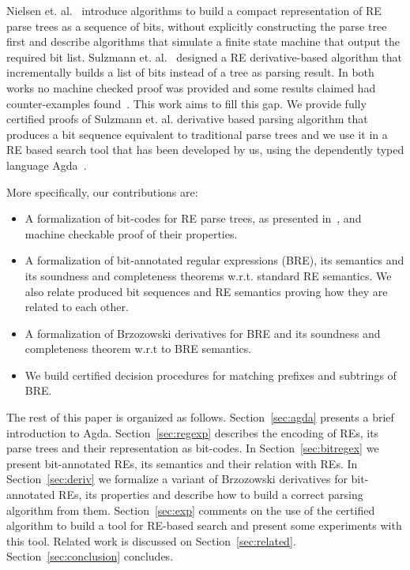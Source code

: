\documentclass[sigplan, anonymous, review]{acmart}
\theoremstyle{definition}
\begin{document}
Nielsen et. al.~\cite{Nielsen2011} introduce algorithms to build a compact representation of
RE parse trees as a sequence of bits, without explicitly constructing the parse tree first
and describe algorithms that simulate a finite state machine that output the required bit list. 
Sulzmann et. al.~\cite{SulzmannL14} designed a RE derivative-based algorithm
that incrementally builds a list of bits instead of a tree as parsing result. In both works
no machine checked proof was provided and some results claimed had counter-examples
found~\cite{AusafDU16}. This work aims to fill this gap. We provide fully 
certified proofs of Sulzmann et. al. derivative based parsing algorithm that 
produces a bit sequence equivalent to traditional parse trees and we use it 
in a RE based search tool that has been developed by us, using the dependently typed language
Agda~\cite{Norell2009}.

More specifically, our contributions are:
\begin{itemize}
  \item A formalization of bit-codes for RE parse trees, as presented in~\cite{Nielsen2011},
        and machine checkable proof of their properties.
  \item A formalization of bit-annotated regular expressions (BRE), its semantics 
        and its soundness and completeness theorems w.r.t. standard RE semantics. 
        We also relate produced bit sequences and RE semantics proving how they 
        are related to each other.
  \item A formalization of Brzozowski derivatives for BRE and its soundness and
        completeness theorem w.r.t to BRE semantics.
  \item We build certified decision procedures for matching prefixes and subtrings
        of BRE.
\end{itemize}

The rest of this paper is organized as follows. Section~\ref{sec:agda}
presents a brief introduction to Agda. Section~\ref{sec:regexp}
describes the encoding of REs, its parse trees and their representation as 
bit-codes. In Section~\ref{sec:bitregex} we present bit-annotated REs, 
its semantics and their relation with REs. In Section~\ref{sec:deriv} 
we formalize a variant of Brzozowski derivatives for bit-annotated REs, its 
properties and describe how to build a correct parsing algorithm from them. 
Section~\ref{sec:exp} comments on the use of the certified algorithm to build a tool for
RE-based search and present some experiments with this tool. Related
work is discussed on Section~\ref{sec:related}. Section~\ref{sec:conclusion} concludes.
\end{document}
